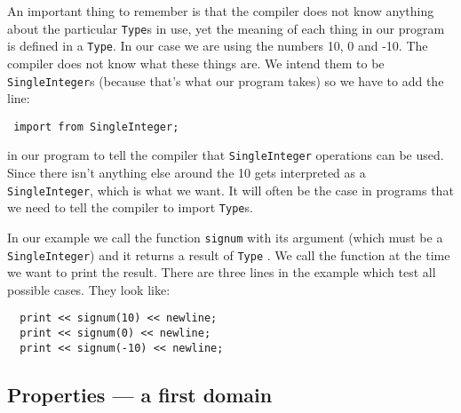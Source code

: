An important thing to remember is that the compiler does not know 
anything about the particular \verb"Type"s in use, yet the meaning of each
thing in our program is defined in a \verb"Type". In our case we are using
the numbers 10, 0 and -10. The compiler does not know what these
things are. We intend them to be {\tt SingleInteger}s (because that's what
our program takes) so we have to add the line:

\begin{small}%
\begin{verbatim}
 import from SingleInteger;
\end{verbatim}
\end{small}

in our program to tell the compiler that \verb"SingleInteger" operations can be used. 
Since there isn't anything else around the 10 gets interpreted
as a \verb"SingleInteger", which is what we want. It will often be the case
in \asharp{} programs that we need to tell the compiler to import \verb"Type"s.

In our example we call the function \verb"signum" with its argument (which
must be a \verb"SingleInteger") and it returns a result of \verb"Type"
. We
call the function at the time we want to print the result. There are
three lines in the example which test all possible cases. They look like:

\begin{small}
\begin{verbatim}
  print << signum(10) << newline;
  print << signum(0) << newline;
  print << signum(-10) << newline;
\end{verbatim}
\end{small}

%
%




\subsection{ Properties --- a first domain}

